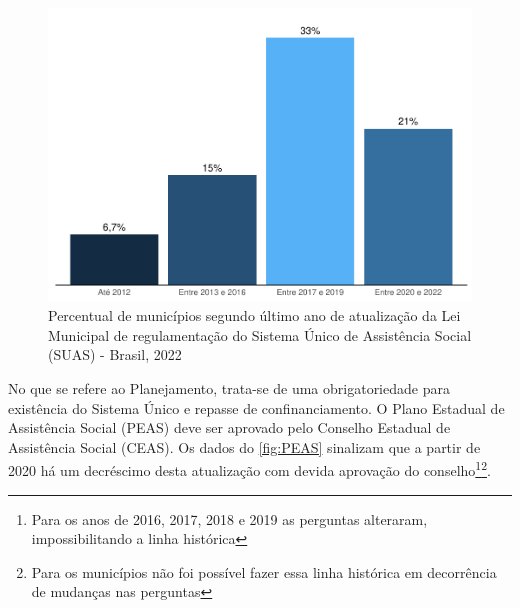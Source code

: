 \documentclass[
  brazilian]{report}
\begin{document}
\begin{figure}
\includegraphics{Censo-SUAS-2022_files/figure-latex/municipios-atualizacao-lei-1} \caption[Percentual de municípios segundo último ano de atualização da Lei Municipal de regulamentação do Sistema Único de Assistência Social (SUAS) - Brasil, 2022]{Percentual de municípios segundo último ano de atualização da Lei Municipal de regulamentação do Sistema Único de Assistência Social (SUAS) - Brasil, 2022}\label{fig:municipios-atualizacao-lei}
\end{figure}

No que se refere ao Planejamento, trata-se de uma obrigatoriedade para
existência do Sistema Único e repasse de confinanciamento. O Plano
Estadual de Assistência Social (PEAS) deve ser aprovado pelo Conselho
Estadual de Assistência Social (CEAS). Os dados do \cref{fig:PEAS}
sinalizam que a partir de 2020 há um decréscimo desta atualização com
devida aprovação do
conselho\footnote{Para os anos de 2016, 2017, 2018 e 2019 as perguntas alteraram, impossibilitando a linha histórica}\footnote{Para os municípios não foi possível fazer essa linha histórica em decorrência de mudanças nas perguntas}.
\end{document}
